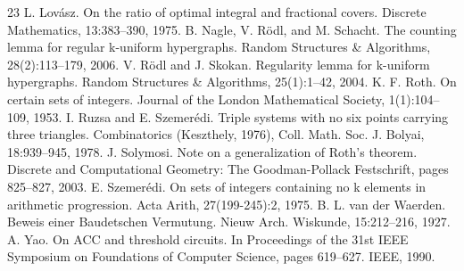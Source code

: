 \documentclass[10pt,a4paper]{article}
\begin{document}
\begin{thebibliography}{23}
 L. Lovász. On the ratio of optimal integral and fractional covers. Discrete Mathematics, 13:383–390, 1975.
 B. Nagle, V. Rödl, and M. Schacht. The counting lemma for regular k-uniform hypergraphs. Random Structures \& Algorithms, 28(2):113–179, 2006.
 V. Rödl and J. Skokan. Regularity lemma for k-uniform hypergraphs. Random Structures \& Algorithms, 25(1):1–42, 2004.
 K. F. Roth. On certain sets of integers. Journal of the London Mathematical Society, 1(1):104– 109, 1953.
 I. Ruzsa and E. Szemerédi. Triple systems with no six points carrying three triangles. Combinatorics (Keszthely, 1976), Coll. Math. Soc. J. Bolyai, 18:939–945, 1978.
 J. Solymosi. Note on a generalization of Roth’s theorem. Discrete and Computational Geometry: The Goodman-Pollack Festschrift, pages 825–827, 2003.
 E. Szemerédi. On sets of integers containing no k elements in arithmetic progression. Acta Arith, 27(199-245):2, 1975.
 B. L. van der Waerden. Beweis einer Baudetschen Vermutung. Nieuw Arch. Wiskunde, 15:212–216, 1927.
 A. Yao. On ACC and threshold circuits. In Proceedings of the 31st IEEE Symposium on Foundations of Computer Science, pages 619–627. IEEE, 1990.
\end{thebibliography}
\end{document}
